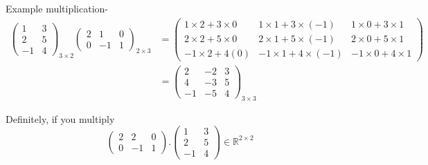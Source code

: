 \documentclass{article}
\begin{document}
Example multiplication-
\begin{align}
    \begin{pmatrix}
        1 & 3\\
        2 & 5\\
        -1 & 4
    \end{pmatrix}_{3\times 2} \begin{pmatrix}
                        2 & 1 & 0\\
                        0 & -1 & 1
                  \end{pmatrix}_{2 \times 3} &= \begin{pmatrix}
                                      1\times 2+3\times 0 & 1\times 1+3\times (-1) & 1\times 0+3\times 1\\
                                      2\times 2+5\times 0 & 2\times 1+5\times (-1) & 2\times 0+5\times 1\\
                                      -1\times 2+4(0) & -1\times 1+4\times (-1) & -1\times 0+4\times 1
                                   \end{pmatrix} \nonumber \\
                                 &= \begin{pmatrix}
                                        2 & -2 & 3\\
                                        4 & -3 & 5\\
                                        -1 & -5 & 4
                                    \end{pmatrix}_{3\times 3} \nonumber
\end{align}

Definitely, if you multiply
\[
    \begin{pmatrix}
        2 & 2 & 0\\
        0 & -1 & 1
    \end{pmatrix} . \begin{pmatrix}
                        1 & 3\\
                        2 & 5\\
                        -1 & 4
                    \end{pmatrix}  \in \mathbb{R} ^ {2\times2}
\]
\end{document}
